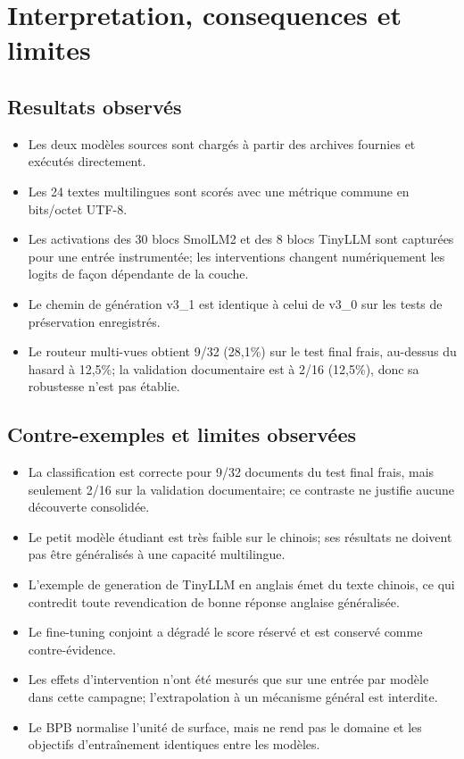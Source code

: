 \documentclass[11pt,a4paper]{article}
\begin{document}
\section{Interpretation, consequences et limites}
\subsection{Resultats observés}
\begin{itemize}
\item Les deux modèles sources sont chargés à partir des archives fournies et exécutés directement.
\item Les 24 textes multilingues sont scorés avec une métrique commune en bits/octet UTF-8.
\item Les activations des 30 blocs SmolLM2 et des 8 blocs TinyLLM sont capturées pour une entrée instrumentée; les interventions changent numériquement les logits de façon dépendante de la couche.
\item Le chemin de génération v3\_1 est identique à celui de v3\_0 sur les tests de préservation enregistrés.
\item Le routeur multi-vues obtient 9/32 (28,1\%) sur le test final frais, au-dessus du hasard à 12,5\%; la validation documentaire est à 2/16 (12,5\%), donc sa robustesse n'est pas établie.
\end{itemize}

\subsection{Contre-exemples et limites observées}
\begin{itemize}
\item La classification est correcte pour 9/32 documents du test final frais, mais seulement 2/16 sur la validation documentaire; ce contraste ne justifie aucune découverte consolidée.
\item Le petit modèle étudiant est très faible sur le chinois; ses résultats ne doivent pas être généralisés à une capacité multilingue.
\item L'exemple de generation de TinyLLM en anglais émet du texte chinois, ce qui contredit toute revendication de bonne réponse anglaise généralisée.
\item Le fine-tuning conjoint a dégradé le score réservé et est conservé comme contre-évidence.
\item Les effets d'intervention n'ont été mesurés que sur une entrée par modèle dans cette campagne; l'extrapolation à un mécanisme général est interdite.
\item Le BPB normalise l'unité de surface, mais ne rend pas le domaine et les objectifs d'entraînement identiques entre les modèles.
\end{itemize}
\end{document}
